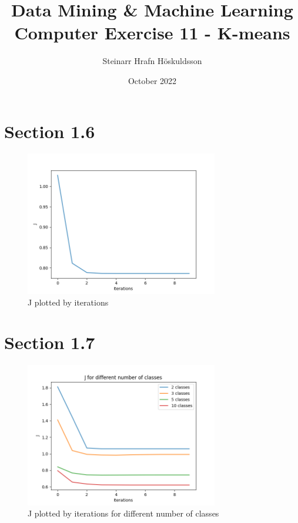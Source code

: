 \documentclass{article}
\title{Data Mining \& Machine Learning \\ \large Computer Exercise 11 - K-means}
\author{Steinarr Hrafn Höskuldsson}
\date{October 2022}
\newcommand{\mycomment}[1]{}
\begin{document}
\maketitle
\mycomment{
\begin{figure}[H]
    \centering
    \texttt{[image: LAB3/Basic1.png]}
    \caption{"Switch test" Breadboard set up}
    \label{fig:Switch_test}
\end{figure}



}

\section*{Section 1.6}
\begin{figure}[h]
    \centering
    \includegraphics[width=0.75\textwidth]{11_k_means/1_6_1.png}
    \caption{J plotted by iterations}
    \label{fig:16}
\end{figure}

\section*{Section 1.7}
\begin{figure}[H]
    \centering
    \includegraphics[width=0.75\textwidth]{11_k_means/1_7_1.png}
    \caption{J plotted by iterations for different number of classes}
    \label{fig:17}
\end{figure}
\end{document}
